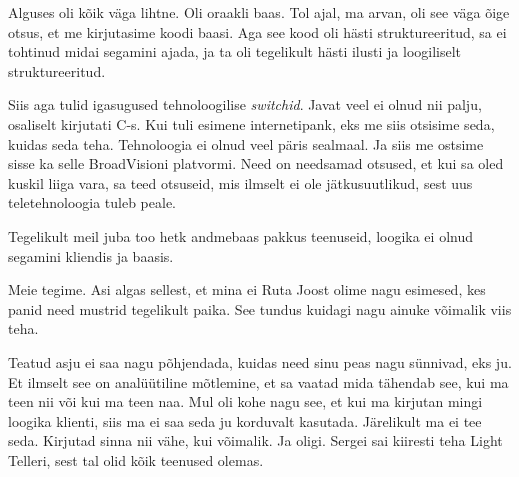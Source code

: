 Alguses oli kõik väga lihtne. Oli oraakli baas. Tol ajal, ma arvan,  oli see 
väga õige otsus, et me kirjutasime koodi baasi. Aga see kood oli hästi 
struktureeritud, sa ei tohtinud midai segamini ajada, ja ta oli tegelikult 
hästi ilusti ja loogiliselt struktureeritud. 

Siis aga tulid igasugused tehnoloogilise \emph{switchid}. Javat veel  ei olnud 
nii palju, osaliselt kirjutati C-s. Kui tuli esimene internetipank, eks me siis 
otsisime  seda, kuidas seda teha. Tehnoloogia ei olnud veel päris sealmaal. Ja 
siis me ostsime  sisse ka selle BroadVisioni platvormi. Need on 
needsamad otsused, et kui sa oled  kuskil liiga vara, sa teed  otsuseid, mis 
ilmselt ei ole  jätkusuutlikud, sest uus teletehnoloogia tuleb peale. 


Tegelikult meil  juba too hetk andmebaas pakkus teenuseid, loogika ei olnud 
segamini kliendis ja baasis. 


Meie tegime. Asi algas  sellest, et mina ei Ruta Joost 
olime nagu esimesed, kes panid need mustrid tegelikult paika. See tundus 
kuidagi nagu ainuke võimalik viis teha. 


Teatud asju ei saa nagu põhjendada, kuidas need sinu peas nagu sünnivad, eks 
ju. Et ilmselt see on analüütiline mõtlemine, et sa vaatad mida tähendab see, 
kui ma teen nii või kui ma teen naa. Mul oli kohe nagu see, et kui ma kirjutan 
mingi loogika klienti, siis ma ei saa seda ju korduvalt kasutada. Järelikult ma 
ei tee seda. Kirjutad sinna nii vähe, kui võimalik. Ja oligi. 
Sergei sai kiiresti teha Light Telleri, sest tal 
olid kõik teenused  olemas. 

